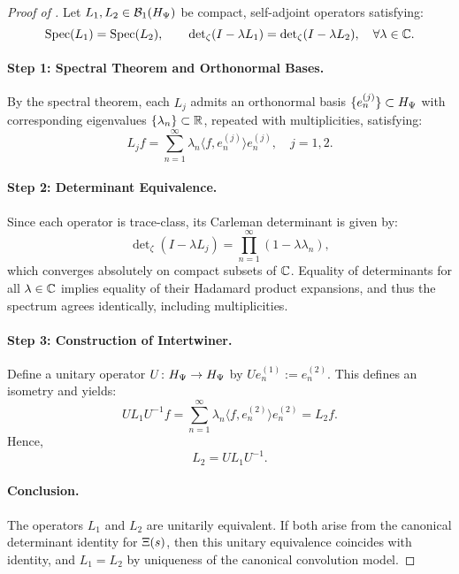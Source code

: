 \begin{proof}[Proof of ]
Let \( L_1, L_2 \in \mathcal{B}_1(H_{\Psi}) \) be compact, self-adjoint operators satisfying:
\[
\operatorname{Spec}(L_1) = \operatorname{Spec}(L_2), \qquad
\det\nolimits_\zeta(I - \lambda L_1) = \det\nolimits_\zeta(I - \lambda L_2), \quad \forall \lambda \in \mathbb{C}.
\]

\paragraph{Step 1: Spectral Theorem and Orthonormal Bases.}
By the spectral theorem, each \( L_j \) admits an orthonormal basis \( \{e_n^{(j)}\} \subset H_{\Psi} \) with corresponding eigenvalues \( \{\lambda_n\} \subset \mathbb{R} \), repeated with multiplicities, satisfying:
\[
L_j f = \sum_{n=1}^\infty \lambda_n \langle f, e_n^{(j)} \rangle e_n^{(j)}, \quad j = 1,2.
\]

\paragraph{Step 2: Determinant Equivalence.}
Since each operator is trace-class, its Carleman determinant is given by:
\[
\det\nolimits_\zeta(I - \lambda L_j) = \prod_{n=1}^\infty (1 - \lambda \lambda_n),
\]
which converges absolutely on compact subsets of \( \mathbb{C} \). Equality of determinants for all \( \lambda \in \mathbb{C} \) implies equality of their Hadamard product expansions, and thus the spectrum agrees identically, including multiplicities.

\paragraph{Step 3: Construction of Intertwiner.}
Define a unitary operator \( U \colon H_{\Psi} \to H_{\Psi} \) by \( U e_n^{(1)} := e_n^{(2)} \). This defines an isometry and yields:
\[
U L_1 U^{-1} f = \sum_{n=1}^\infty \lambda_n \langle f, e_n^{(2)} \rangle e_n^{(2)} = L_2 f.
\]
Hence,
\[
L_2 = U L_1 U^{-1}.
\]

\paragraph{Conclusion.}
The operators \( L_1 \) and \( L_2 \) are unitarily equivalent. If both arise from the canonical determinant identity for \( \Xi(s) \), then this unitary equivalence coincides with identity, and \( L_1 = L_2 \) by uniqueness of the canonical convolution model.
\end{proof}
